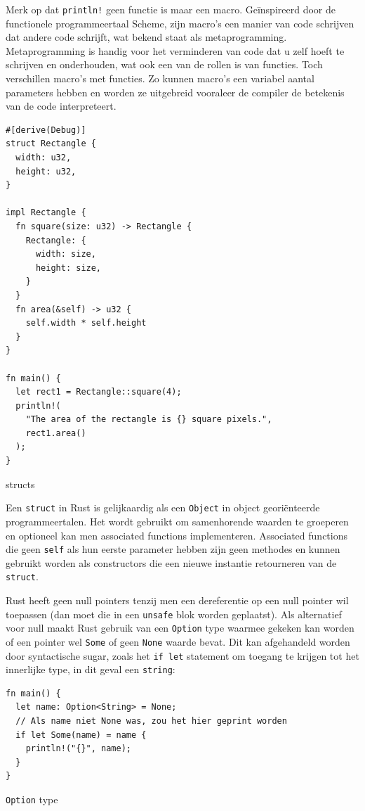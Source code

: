 \clearpage

Merk op dat \texttt{println!} geen functie is maar een macro. Geïnspireerd door de
functionele programmeertaal Scheme, zijn macro’s een manier van code schrijven dat andere code
schrijft, wat bekend staat als metaprogramming. Metaprogramming is handig voor het verminderen van
code dat u zelf hoeft te schrijven en onderhouden, wat ook een van de rollen is van functies. Toch
verschillen macro’s met functies. Zo kunnen macro’s een variabel aantal parameters hebben en worden
ze uitgebreid vooraleer de compiler de betekenis van de code interpreteert.

\begin{listing}[h]
\begin{verbatim}
#[derive(Debug)]
struct Rectangle {
  width: u32,
  height: u32,
}

impl Rectangle {
  fn square(size: u32) -> Rectangle {
    Rectangle: {
      width: size,
      height: size,
    }
  }
  fn area(&self) -> u32 {
    self.width * self.height
  }
}

fn main() {
  let rect1 = Rectangle::square(4);
  println!(
    "The area of the rectangle is {} square pixels.",
    rect1.area()
  );
}

\end{verbatim}
\caption{structs}
\end{listing}

Een \texttt{struct} in Rust is gelijkaardig als een \texttt{Object} in object
georiënteerde programmeertalen. Het wordt gebruikt om samenhorende waarden te groeperen en optioneel
kan men associated functions implementeren. Associated functions die geen \texttt{self}
als hun eerste parameter hebben zijn geen methodes en kunnen gebruikt worden als constructors die
een nieuwe instantie retourneren van de \texttt{struct}.

\clearpage

Rust heeft geen null pointers tenzij men een dereferentie op een null pointer wil toepassen (dan
moet die in een \texttt{unsafe} blok worden geplaatst). Als alternatief voor null maakt
Rust gebruik van een \texttt{Option} type waarmee gekeken kan worden of een pointer wel
\texttt{Some} of geen \texttt{None} waarde bevat. Dit kan afgehandeld worden
door syntactische sugar, zoals het \texttt{if let} statement om toegang te krijgen tot het
innerlijke type, in dit geval een \texttt{string}:

\begin{listing}[h]
\begin{verbatim}
fn main() {
  let name: Option<String> = None;
  // Als name niet None was, zou het hier geprint worden
  if let Some(name) = name {
    println!("{}", name);
  }
}
\end{verbatim}
\caption{\texttt{Option} type}
\end{listing}

